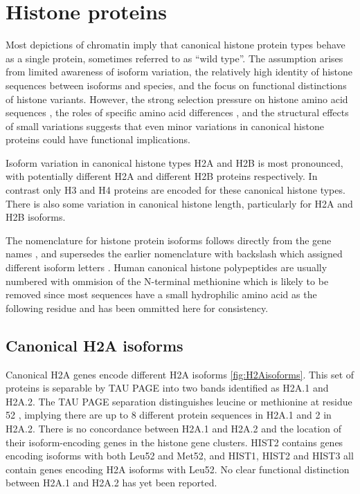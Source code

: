 \section{Histone proteins}

	Most depictions of chromatin imply that 
	canonical histone protein types behave as a single protein, 
	sometimes referred to as ``wild type''. 
	The assumption arises from limited awareness of isoform variation, 
	the relatively high identity of histone sequences between isoforms and species, 
	and the focus on functional distinctions of histone variants. 
	However, the strong selection pressure on histone amino acid sequences \citep{birth-death-review},
	the roles of specific amino acid differences \citep{MazeAllis2014}, 
	and the structural effects of small variations \citep{KurumizakaCOSB2013} 
	suggests that even minor variations in canonical histone proteins 
	could have functional implications.
	
	Isoform variation in canonical histone types H2A and H2B is most pronounced, 
	with potentially \HTwoAUniqueProteins{} different H2A 
	and \HTwoBUniqueProteins{} different H2B proteins respectively. 
	In contrast only \HThreeUniqueProteins{} H3 and \HFourUniqueProteins{} H4 proteins 
	are encoded for these canonical histone types. 
	There is also some variation in canonical histone length, particularly for H2A and H2B isoforms.

	The nomenclature for histone protein isoforms follows directly from the gene names \citep{Marzluff02}, 
	and supersedes the earlier nomenclature with backslash which assigned different isoform letters \citep{AlbigGenomics1997,AlbigHumangen1997}.
	Human canonical histone polypeptides are usually numbered 
	with ommision of the N-terminal methionine 
	which is likely to be removed since most sequences have 
	a small hydrophilic amino acid as the following residue \citep{XiaoPeiBiochem2010} 
	and has been ommitted here for consistency.

  \subsection{Canonical H2A isoforms}
	
	Canonical H2A genes encode \HTwoAUniqueProteins{} different H2A isoforms \ref{fig:H2Aisoforms}.
	This set of proteins is separable by TAU PAGE into two bands identified as H2A.1 and H2A.2. 
	The TAU PAGE separation distinguishes leucine or methionine at residue 52 \citep{FranklinZweidler1977,Zweidler1977}, 
	implying there are up to 8 different protein sequences in H2A.1 and 2 in H2A.2. 
	There is no concordance between H2A.1 and H2A.2 
	and the location of their isoform-encoding genes in the histone gene clusters. 
	HIST2 contains genes encoding isoforms with both Leu52 and Met52, 
	and HIST1, HIST2 and HIST3 all contain genes encoding H2A isoforms with Leu52. 
	No clear functional distinction between H2A.1 and H2A.2 has yet been reported.

